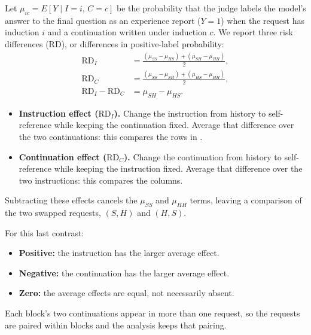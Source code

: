 \documentclass[11pt]{article}
\newcommand{\rd}{\mathrm{RD}}
\begin{document}
Let $\mu_{ic}=E[Y\mid I=i,\,C=c]$ be the probability that the judge labels the
model's answer to the final question as an experience report ($Y=1$) when the
request has induction $i$ and a continuation written under induction $c$. We
report three risk differences ($\rd$), or differences in positive-label
probability:
\begin{align}
\rd_I&=\frac{(\mu_{SS}-\mu_{HS})+(\mu_{SH}-\mu_{HH})}{2},\label{eq:instruction}\\
\rd_C&=\frac{(\mu_{SS}-\mu_{SH})+(\mu_{HS}-\mu_{HH})}{2},\label{eq:transcript}\\
\rd_I-\rd_C&=\mu_{SH}-\mu_{HS}.\label{eq:incongruent}
\end{align}
\begin{itemize}
\item \textbf{Instruction effect ($\rd_I$).} Change the instruction from
history to self-reference while keeping the continuation fixed. Average
that difference over the two continuations: this compares the rows in
.
\item \textbf{Continuation effect ($\rd_C$).} Change the continuation from
history to self-reference while keeping the instruction fixed. Average
that difference over the two instructions: this compares the columns.
\end{itemize}
Subtracting these effects cancels the $\mu_{SS}$ and $\mu_{HH}$ terms,
leaving a comparison of the two swapped requests, $(S,H)$ and $(H,S)$.
\begin{samepage}
For this last contrast:
\begin{itemize}
\item \textbf{Positive:} the instruction has the larger average effect.
\item \textbf{Negative:} the continuation has the larger average effect.
\item \textbf{Zero:} the average effects are equal, not necessarily absent.
\end{itemize}
\end{samepage}
Each block's two continuations appear in more than one request, so the
requests are paired within blocks and the analysis keeps that pairing.
\end{document}
